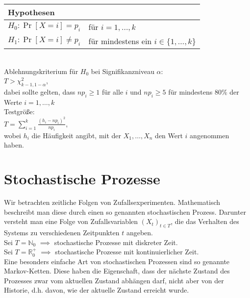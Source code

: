 \documentclass[a4paper,9pt]{extarticle}
\begin{document}
\begin{tabular}{ll}
\multicolumn{2}{l}{Hypothesen} \\
\hline
$H_0 : \Pr[X = i] = p_i$ & für $i = 1, \dots, k$ \\
$H_1 : \Pr[X = i] ≠ p_i$ & für mindestens ein $i \in \{1, \dots, k\}$
\end{tabular} \\

Ablehnungskriterium für $H_0$ bei Signifikanzniveau $\alpha$: \\
$T > \chi_{k - 1, 1 - \alpha}^2$, \\
dabei sollte gelten, dass $np_i ≥ 1$ für alle $i$ und $np_i ≥ 5$ für mindestens $80\%$ der Werte $i = 1, \dots, k$ \\

Testgröße: \\
$T = \sum_{i = 1}^k \frac{(h_i - np_i)^2}{np_i}$, \\
wobei $h_i$ die Häufigkeit angibt, mit der $X_1, \dots, X_n$ den Wert $i$ angenommen haben.

\newpage

\section*{Stochastische Prozesse}
Wir betrachten zeitliche Folgen von Zufallsexperimenten. Mathematisch beschreibt
man diese durch einen so genannten stochastischen Prozess. Darunter versteht man
eine Folge von Zufallsvariablen $(X_t)_{t \in T}$, die das Verhalten des Systems zu
verschiedenen Zeitpunkten $t$ angeben. \\

Sei $T = \mathbb{N}_0$ $\implies$ stochastische Prozesse mit diskreter Zeit. \\
Sei $T = \mathbb{R}_0^+$ $\implies$ stochastische Prozesse mit kontinuierlicher Zeit. \\

Eine besonders einfache Art von stochastischen Prozessen sind so genannte
Markov-Ketten. Diese haben die Eigenschaft, dass der nächste Zustand des Prozesses
zwar vom aktuellen Zustand abhängen darf, nicht aber von der Historie, d.h. davon,
wie der aktuelle Zustand erreicht wurde.
\end{document}
